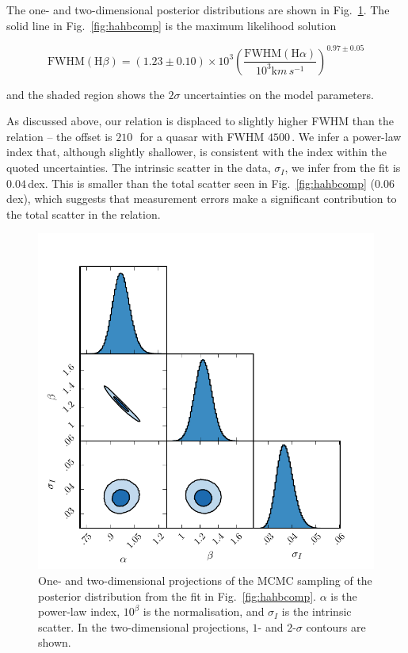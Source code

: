 The one- and two-dimensional posterior distributions are shown in Fig.~\ref{fig:ha_hb_mcmc_samples}. 
The solid line in Fig.~\ref{fig:hahbcomp} is the maximum likelihood solution

\begin{equation}
  \label{eq:ha2hb}
  \mathrm{FWHM}(\mathrm{H}\beta) = \left( 1.23 \pm 0.10 \right) \times 10^3 \left( \frac{\mathrm{FWHM}(\mathrm{H}\alpha)}{10^3 {\mathrm km\,s^{-1}}} \right)^{0.97 \pm 0.05}
\end{equation}

\noindent and the shaded region shows the $2\sigma$ uncertainties on the model parameters.

As discussed above, our relation is displaced to slightly higher \hb FWHM than the \citet{greene05b} relation -- the offset is $210$\,\kms\, for a quasar with \ha FWHM $4500$\,\kms.  
We infer a power-law index that, although slightly shallower, is consistent with the \citet{greene05b} index within the quoted uncertainties. 
The intrinsic scatter in the data, $\sigma_I$, we infer from  the fit is $0.04$\,dex. 
This is smaller than the total scatter seen in Fig.~\ref{fig:hahbcomp} ($0.06$\,dex), which suggests that measurement errors make a significant contribution to the total scatter in the relation. 

\begin{figure}[h!]
    \centering
    \includegraphics[width=\columnwidth]{figures/chapter03/ha_hb_mcmc_parameters.pdf} 
    \caption[{One- and two-dimensional projections of the MCMC sampling of the posterior distribution from the fit in Fig.~\ref{fig:hahbcomp}.}]{One- and two-dimensional projections of the MCMC sampling of the posterior distribution from the fit in Fig.~\ref{fig:hahbcomp}. $\alpha$ is the power-law index, $10^\beta$ is the normalisation, and $\sigma_I$ is the intrinsic scatter. In the two-dimensional projections, $1$- and $2$-$\sigma$ contours are shown.} 
    \label{fig:ha_hb_mcmc_samples}
\end{figure}

